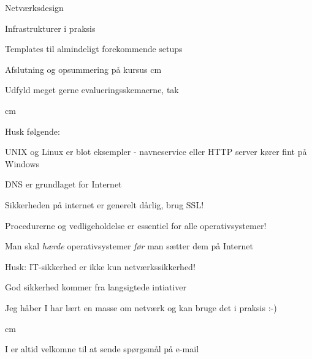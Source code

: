 \documentclass[Screen16to9,17pt]{foils}
\begin{document}

\begin{list1}
\item Netværksdesign
\item Infrastrukturer i praksis
\item Templates til almindeligt forekommende setups
\item Afslutning og opsummering på kursus
 cm
\item Udfyld meget gerne evalueringsskemaerne, tak
\end{list1}















 cm

\begin{list1}
\item Husk følgende:
\begin{list2}
\item UNIX og Linux er blot eksempler - navneservice eller HTTP
  server kører fint på Windows
\item DNS er grundlaget for Internet
\item Sikkerheden på internet er generelt dårlig, brug SSL!
\item Procedurerne og vedligeholdelse er essentiel for alle
  operativsystemer!
\item Man skal \emph{hærde} operativsystemer \emph{før} man sætter dem på
  Internet
\item Husk: IT-sikkerhed er ikke kun netværkssikkerhed!
\item God sikkerhed kommer fra langsigtede intiativer\\
\end{list2}
\item Jeg håber I har lært en masse om netværk og kan bruge det i praksis :-)
\end{list1}



\vskip 4cm

\begin{center}
\hlkbig

\myname

\myweb
{} cm

I er altid velkomne til at sende spørgsmål på e-mail
\end{center}
\end{document}
